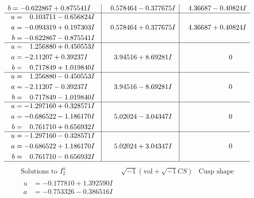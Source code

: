 \documentclass[1p]{elsarticle_modified}
\theoremstyle{definition}
\newcommand{\I}{\sqrt{-1}}
\begin{document}
$$\begin{array}{c|c|c}
\begin{aligned}
b &= -0.622867 + 0.875541 I\end{aligned}
 & \phantom{-}0.578464 - 0.377675 I & \phantom{-}4.36687 - 0.40824 I \\ \hline\begin{aligned}
u &= \phantom{-}0.103711 - 0.656824 I \\
a &= -0.093319 + 0.197303 I \\
b &= -0.622867 - 0.875541 I\end{aligned}
 & \phantom{-}0.578464 + 0.377675 I & \phantom{-}4.36687 + 0.40824 I \\ \hline\begin{aligned}
u &= \phantom{-}1.256880 + 0.450553 I \\
a &= -2.11207 + 0.39237 I \\
b &= \phantom{-}0.717849 + 1.019840 I\end{aligned}
 & \phantom{-}3.94516 + 8.69281 I & \phantom{-0.000000 } 0 \\ \hline\begin{aligned}
u &= \phantom{-}1.256880 - 0.450553 I \\
a &= -2.11207 - 0.39237 I \\
b &= \phantom{-}0.717849 - 1.019840 I\end{aligned}
 & \phantom{-}3.94516 - 8.69281 I & \phantom{-0.000000 } 0 \\ \hline\begin{aligned}
u &= -1.297160 + 0.328571 I \\
a &= -0.686522 - 1.186170 I \\
b &= \phantom{-}0.761710 + 0.656932 I\end{aligned}
 & \phantom{-}5.02024 - 3.04347 I & \phantom{-0.000000 } 0 \\ \hline\begin{aligned}
u &= -1.297160 - 0.328571 I \\
a &= -0.686522 + 1.186170 I \\
b &= \phantom{-}0.761710 - 0.656932 I\end{aligned}
 & \phantom{-}5.02024 + 3.04347 I & \phantom{-0.000000 } 0\\
 \hline 
 \end{array}$$\newpage$$\begin{array}{c|c|c}  
\text{Solutions to }I^u_{2}& \I (\text{vol} + \sqrt{-1}CS) & \text{Cusp shape}\\
 \hline 
\begin{aligned}
u &= -0.177810 + 1.392590 I \\
a &= -0.753326 - 0.386516 I \\

\end{aligned}
\end{array}$$
\end{document}
